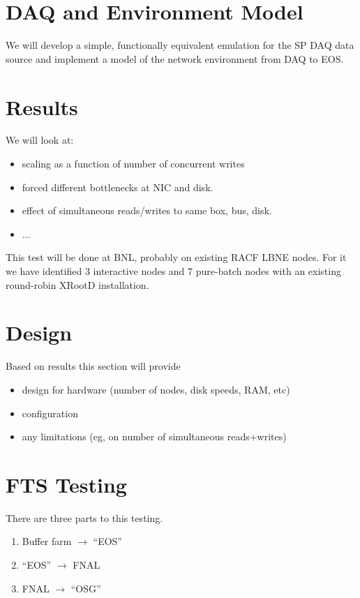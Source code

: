 \documentclass[pdftex,12pt,letter]{article}
\begin{document}
\section{DAQ and Environment Model}

We will develop a simple, functionally equivalent emulation for the SP
DAQ data source and implement a model of the network environment from
DAQ to EOS.

\section{Results}

We will look at:

\begin{itemize}
\item scaling as a function of number of concurrent writes 
\item forced different bottlenecks at NIC and disk.
\item effect of simultaneous reads/writes to same box, bus, disk. 
\item ...
\end{itemize}

This test will be done at BNL, probably on existing RACF LBNE nodes.
For it we have identified 3 interactive nodes and 7 pure-batch nodes
with an existing round-robin XRootD installation.

\section{Design}

Based on results this section will provide 
\begin{itemize}
\item design for hardware (number of nodes, disk speeds, RAM, etc)
\item configuration
\item any limitations (eg, on number of simultaneous reads+writes)
\end{itemize}

\section{FTS Testing}

There are three parts to this testing.

\begin{enumerate}
\item Buffer farm $\to$ ``EOS''
\item ``EOS'' $\to$ FNAL
\item FNAL $\to$ ``OSG''
\end{enumerate}
\end{document}
